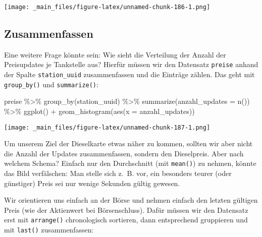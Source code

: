 \documentclass[
  ngerman,
]{article}
\newenvironment{Shaded}{\begin{snugshade}}{\end{snugshade}}
\newcommand{\AttributeTok}[1]{\textcolor[rgb]{0.77,0.63,0.00}{#1}}
\newcommand{\FunctionTok}[1]{\textcolor[rgb]{0.00,0.00,0.00}{#1}}
\newcommand{\NormalTok}[1]{#1}
\newcommand{\SpecialCharTok}[1]{\textcolor[rgb]{0.00,0.00,0.00}{#1}}
\begin{document}
\texttt{[image: \_main\_files/figure-latex/unnamed-chunk-186-1.png]}

\hypertarget{zusammenfassen}{%
\subsection{Zusammenfassen}\label{zusammenfassen}}

Eine weitere Frage könnte sein: Wie sieht die Verteilung der Anzahl der Preisupdates je Tankstelle aus? Hierfür müssen wir den Datensatz \texttt{preise} anhand der Spalte \texttt{station\_uuid} zusammenfassen und die Einträge zählen. Das geht mit \texttt{group\_by()} und \texttt{summarize()}:

\begin{Shaded}
\begin{Highlighting}[]
\NormalTok{preise }\SpecialCharTok{\%\textgreater{}\%}
  \FunctionTok{group\_by}\NormalTok{(station\_uuid) }\SpecialCharTok{\%\textgreater{}\%}
  \FunctionTok{summarize}\NormalTok{(}\AttributeTok{anzahl\_updates =} \FunctionTok{n}\NormalTok{()) }\SpecialCharTok{\%\textgreater{}\%}
  \FunctionTok{ggplot}\NormalTok{() }\SpecialCharTok{+}
    \FunctionTok{geom\_histogram}\NormalTok{(}\FunctionTok{aes}\NormalTok{(}\AttributeTok{x =}\NormalTok{ anzahl\_updates))}
\end{Highlighting}
\end{Shaded}

\texttt{[image: \_main\_files/figure-latex/unnamed-chunk-187-1.png]}

Um unserem Ziel der Dieselkarte etwas näher zu kommen, sollten wir aber nicht die Anzahl der Updates zusammenfassen, sondern den Dieselpreis.
Aber nach welchem Schema?
Einfach nur den Durchschnitt (mit \texttt{mean()}) zu nehmen, könnte das Bild verfälschen: Man stelle sich z.~B. vor, ein besonders teurer (oder günstiger) Preis sei nur wenige Sekunden gültig gewesen.

Wir orientieren uns einfach an der Börse und nehmen einfach den letzten gültigen Preis (wie der Aktienwert bei Börsenschluss).
Dafür müssen wir den Datensatz erst mit \texttt{arrange()} chronologisch sortieren, dann entsprechend gruppieren und mit \texttt{last()} zusammenfassen:
\end{document}
